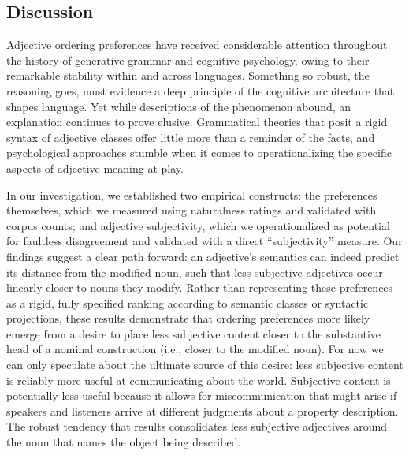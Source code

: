 \documentclass{pnastwo}
\begin{document}
\begin{article}
\section{Discussion}

Adjective ordering preferences have received considerable attention throughout the history of generative grammar and cognitive psychology, owing to their remarkable stability within and across languages. Something so robust, the reasoning goes, must evidence a deep principle of the cognitive architecture that shapes language. Yet while descriptions of the phenomenon abound, an explanation continues to prove elusive. Grammatical theories that posit a rigid syntax of adjective classes offer little more than a reminder of the facts, and psychological approaches stumble when it comes to operationalizing the specific aspects of adjective meaning at play. 

In our investigation, we established two empirical constructs: the preferences themselves, which we measured using naturalness ratings and validated with corpus counts; and adjective subjectivity, which we operationalized as potential for faultless disagreement and validated with a direct ``subjectivity'' measure. Our findings suggest a clear path forward: an adjective's semantics can indeed predict its distance from the modified noun, such that less subjective adjectives occur linearly closer to nouns they modify. Rather than representing these preferences as a rigid, fully specified ranking according to semantic classes or syntactic projections, these results demonstrate that ordering preferences more likely emerge from a desire to place less subjective content closer to the substantive head of a nominal construction (i.e., closer to the modified noun). For now we can only speculate about the ultimate source of this desire: less subjective content is reliably more useful at communicating about the world. Subjective content is potentially less useful because it allows for miscommunication that might arise if speakers and listeners arrive at different judgments about a property description. The robust tendency that results consolidates less subjective adjectives around the noun that names the object being described.


\begin{materials}

\end{materials}
\end{article}
\end{document}
